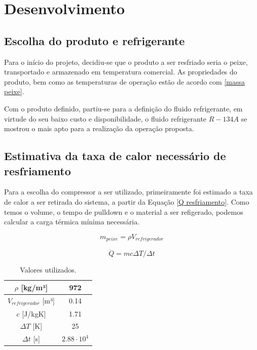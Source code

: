 \chapter{Desenvolvimento}

\section{Escolha do produto e refrigerante}

    Para o início do projeto, decidiu-se que o produto a ser resfriado seria o peixe, transportado e armazenado em temperatura comercial. As propriedades do produto, bem como as temperaturas de operação estão de acordo com \ref{massa peixe}. 

    Com o produto definido, partiu-se para a definição do fluido refrigerante, em virtude do seu baixo custo e disponibilidade, o fluido refrigerante $R-134A$ se mostrou o mais apto para a realização da operação proposta.

\section{Estimativa da taxa de calor necessário de resfriamento}

    Para a escolha do compressor a ser utilizado, primeiramente foi estimado a taxa de calor a ser retirada do sistema, a partir da Equação \ref{Q resfriamento}. Como temos o volume, o tempo de pulldown e o material a ser refigerado, podemos calcular a carga térmica mínima necessária.

\begin{equation}
    m_{peixe} = \rho V_{refrigerador}
    \label{massa peixe}
\end{equation}

\begin{equation}
    \dot{Q} = m c \Delta T / \Delta t
    \label{Q resfriamento}
\end{equation}


\begin{table}[h]
\centering
\begin{tabular}{|c|c|}
\hline
$\rho$ {[}kg/m³{]} & 972 \\ \hline
$V_{refrigerador}$ {[}m³{]}     & 0.14 \\ \hline
$c$ {[}J/kgK{]}     &  1.71 \\ \hline
$\Delta T$ {[}K{]}     &  25 \\ \hline
$\Delta t$ {[}s{]}     &  $2.88 \cdot10^{4}$ \\ \hline
\end{tabular}
\caption{Valores utilizados.}
\label{tab:tabela dados}
\end{table}

